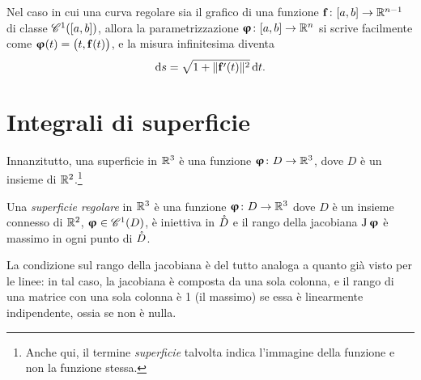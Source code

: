 Nel caso in cui una curva regolare sia il grafico di una funzione $\vec f\colon[a,b]\to\R^{n-1}$ di classe $\cont[1]{[a,b]}$, allora la parametrizzazione $\vphi\colon[a,b]\to\R^n$ si scrive facilmente come $\vphi(t)=\big(t,\vec f(t)\big)$, e la misura infinitesima diventa
\begin{equation}
	\dd s=\sqrt{1+\norm{\vec f'(t)}^2}\,\dd t.
\end{equation}

\section{Integrali di superficie}
Innanzitutto, una superficie in $\R^3$ è una funzione $\vphi\colon D\to\R^3$, dove $D$ è un insieme di $\R^2$.\footnote{Anche qui, il termine \emph{superficie} talvolta indica l'immagine della funzione e non la funzione stessa.}
\begin{definizione} \label{d:superficie-regolare}
	Una \emph{superficie regolare} in $\R^3$ è una funzione $\vphi\colon D\to\R^3$ dove $D$ è un insieme connesso di $\R^2$, $\vphi\in\cont[1]{D}$, è iniettiva in $\interior{D}$ e il rango della jacobiana $\jac\vphi$ è massimo in ogni punto di $\interior{D}$.
\end{definizione}
La condizione sul rango della jacobiana è del tutto analoga a quanto già visto per le linee: in tal caso, la jacobiana è composta da una sola colonna, e il rango di una matrice con una sola colonna è 1 (il massimo) se essa è linearmente indipendente, ossia se non è nulla.

